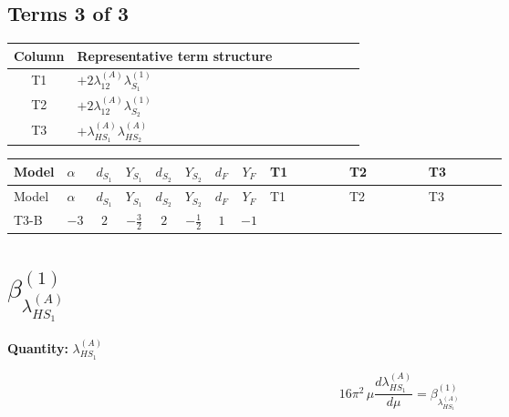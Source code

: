 \documentclass[8pt]{article}
\begin{document}
\begin{landscape}
\subsection*{Terms 3 of 3}
\begin{center}
\begin{tabular}{@{}c >{\raggedright\arraybackslash}p{0.82\linewidth}@{}}
\toprule
Column & Representative term structure \\
\midrule
T1 & \(\displaystyle +2 {\lambda_{12}^{(A)}} {\lambda_{S_1}^{(1)}}\) \\
\midrule
T2 & \(\displaystyle +2 {\lambda_{12}^{(A)}} {\lambda_{S_2}^{(1)}}\) \\
\midrule
T3 & \(\displaystyle +{\lambda_{HS_1}^{(A)}} {\lambda_{HS_2}^{(A)}}\) \\
\midrule
\bottomrule
\end{tabular}
\end{center}
\smallskip
\tiny
\begin{longtable}{@{}llcccccc >{\raggedright\arraybackslash}p{0.21\linewidth} >{\raggedright\arraybackslash}p{0.21\linewidth} >{\raggedright\arraybackslash}p{0.21\linewidth}@{}}
\toprule
Model & $\alpha$ & $d_{S_1}$ & $Y_{S_1}$ & $d_{S_2}$ & $Y_{S_2}$ & $d_F$ & $Y_F$ & T1 & T2 & T3 \\
\midrule
\endfirsthead
\toprule
Model & $\alpha$ & $d_{S_1}$ & $Y_{S_1}$ & $d_{S_2}$ & $Y_{S_2}$ & $d_F$ & $Y_F$ & T1 & T2 & T3 \\
\midrule
\endhead
T3-B & $-3$ & $2$ & $-\frac{3}{2}$ & $2$ & $-\frac{1}{2}$ & $1$ & $-1$ & \scriptsize\adjustbox{max width=\linewidth}{$\begin{gathered} +2 {\lambda_{12}^{(A)}} {\lambda_{S_1}^{(1)}}\end{gathered}$} & \scriptsize\adjustbox{max width=\linewidth}{$\begin{gathered} +2 {\lambda_{12}^{(A)}} {\lambda_{S_2}^{(1)}}\end{gathered}$} & \scriptsize\adjustbox{max width=\linewidth}{$\begin{gathered} +{\lambda_{HS_1}^{(A)}} {\lambda_{HS_2}^{(A)}}\end{gathered}$} \\
\midrule
\bottomrule
\end{longtable}
\clearpage
\section*{$\beta_{\lambda_{HS_1}^{(A)}}^{(1)}$}
\noindent\textbf{Quantity: }$\lambda_{HS_1}^{(A)}$\par\smallskip
\[16\pi^2\,\mu\frac{d \lambda_{HS_1}^{(A)}}{d\mu}=\beta_{\lambda_{HS_1}^{(A)}}^{(1)}\]

\end{landscape}
\end{document}
